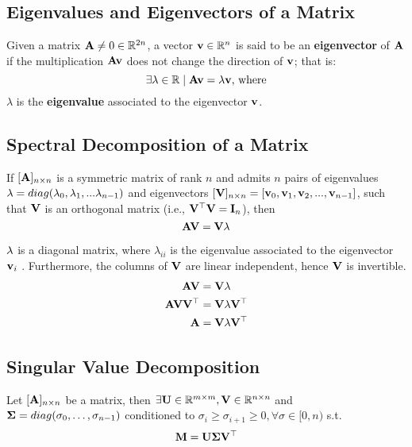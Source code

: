 \subsection{Eigenvalues and Eigenvectors of a Matrix}

Given a matrix $\mathbf{A} \ne 0 \in \mathbb{R}^{2n}$, a vector $\mathbf{v} \in \mathbb{R}^n$ is said to be an \textbf{eigenvector} of $\mathbf{A}$ if the multiplication $\mathbf{Av}$ does not change the direction of $\mathbf{v}$; that is:
$$\exists \lambda \in \mathbb{R} \mid \mathbf{Av} = \lambda \mathbf{v} \textnormal{, where}$$
$\lambda$ is the \textbf{eigenvalue} associated to the eigenvector $\mathbf{v}$.

\subsection{Spectral Decomposition of a Matrix}

If $[\mathbf{A}]_{n\times n}$ is a symmetric matrix of rank $n$ and admits $n$ pairs of eigenvalues $\mathbf{\lambda} = diag(\lambda_0, \lambda_1, ... \lambda_{n-1})$ and eigenvectors $[\mathbf{V}]_{n\times n} = [\mathbf{v}_0, \mathbf{v}_1, \mathbf{v}_2, ..., \mathbf{v}_{n-1}]$, such that $\mathbf{V}$ is an orthogonal matrix (i.e., $\mathbf{V}^\top \mathbf{V}=\mathbf{I}_n$), then
$$\mathbf{AV} = \mathbf{V \lambda}$$

$\mathbf{\lambda}$ is a diagonal matrix, where $\lambda_{ii}$ is the eigenvalue associated to the eigenvector $\mathbf{v}_i$ \cite{cox2001}. Furthermore, the columns of $\mathbf{V}$ are linear independent, hence $\mathbf{V}$ is invertible.
\begin{align*}
	\mathbf{AV} &= \mathbf{V \lambda} \\
	\mathbf{AVV^\top} &= \mathbf{V \lambda V^\top} \\
	\mathbf{A} &= \mathbf{V \lambda V^\top}
\end{align*}

\subsection{Singular Value Decomposition}
\label{sec:svd}
Let $[\mathbf{A}]_{n\times n}$ be a matrix, then $\exists \mathbf{U} \in \mathbb{R}^{m \times m}, \mathbf{V} \in \mathbb{R}^{n \times n}$ and $\mathbf{\Sigma} =  diag(\sigma_0, \dots, \sigma_{n-1})$ conditioned to $\sigma_i \ge \sigma_{i+1} \ge 0, \forall \sigma \in [0, n)$ s.t. \cite{gan2008}
$$\mathbf{M} = \mathbf{U\Sigma V^\top}$$

